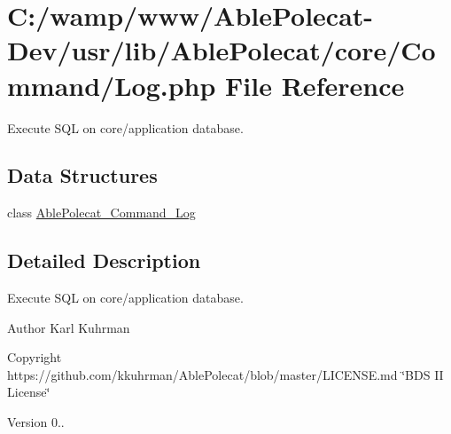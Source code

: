 \hypertarget{_command_2_log_8php}{}\section{C\+:/wamp/www/\+Able\+Polecat-\/\+Dev/usr/lib/\+Able\+Polecat/core/\+Command/\+Log.php File Reference}
\label{_command_2_log_8php}


Execute S\+Q\+L on core/application database.  


\subsection*{Data Structures}
\begin{DoxyCompactItemize}
\item 
class \hyperlink{class_able_polecat___command___log}{Able\+Polecat\+\_\+\+Command\+\_\+\+Log}
\end{DoxyCompactItemize}


\subsection{Detailed Description}
Execute S\+Q\+L on core/application database. 

\begin{DoxyAuthor}{Author}
Karl Kuhrman 
\end{DoxyAuthor}
\begin{DoxyCopyright}{Copyright}
https\+://github.com/kkuhrman/\+Able\+Polecat/blob/master/\+L\+I\+C\+E\+N\+S\+E.\+md \char`\"{}\+B\+D\+S I\+I License\char`\"{} 
\end{DoxyCopyright}
\begin{DoxyVersion}{Version}
0.. 
\end{DoxyVersion}
